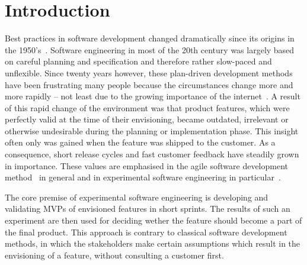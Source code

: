 %
\chapter{Introduction}
\label{sec:intro}

Best practices in software development changed dramatically since its origins in the 1950's~\cite{boehm2006view}.
Software engineering in most of the 20th century was largely based on careful planning and specification and therefore rather slow-paced and unflexible.
Since twenty years however, these plan-driven development methods have been frustrating many people because the circumstances change more and more rapidly -- not least due to the growing importance of the internet~\cite{Williams2003}.
A result of this rapid change of the environment was that product features, which were perfectly valid at the time of their envisioning, became outdated, irrelevant or otherwise undesirable during the planning or implementation phase.
This insight often only was gained when the feature was shipped to the customer.
As a consequence, short release cycles and fast customer feedback have steadily grown in importance.
These values are emphasised in the agile software development method~\cite{fowler2001agile} in general and in experimental software engineering in particular~\cite{???}.

The core premise of experimental software engineering is developing and validating MVPs of envisioned features in short sprints.
The results of such an experiment are then used for deciding wether the feature should become a part of the final product.
This approach is contrary to classical software development methods, in which the stakeholders make certain assumptions which result in the envisioning of a feature, without consulting a customer first.
